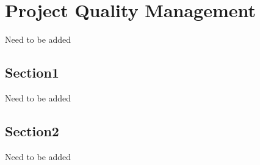 \chapter{Project Quality Management}
Need to be added
\section{Section1}
Need to be added
\section{Section2}
Need to be added

\FloatBarrier
\newpage